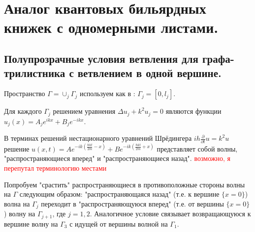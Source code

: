 \chapter{Аналог квантовых бильярдных книжек с одномерными листами.}\label{ch:ch7}

\section{Полупрозрачные условия ветвления для графа-трилистника с ветвлением в одной вершине.}\label{sec:ch7/sect1}
Пространство $\Gamma = \cup_j \Gamma_j$ используем как в \label{ch:ch4}: $\Gamma_j = [0, l_j]$.

Для каждого $\Gamma_j$ решением уравнения $\Delta u_j + k^2 u_j = 0$ являются функции 
$u_j(x) = A_j e^{i k x} + B_j e^{-i k x}$. 

В терминах решений нестационарного уравнений Шрёдингера $i h \frac{\partial }{\partial t} u = k^2 u$
решение $u(x,t) = A e^{-i k (\frac{\hbar k t}{2m} - x)} +  B e^{-i k (\frac{\hbar k t}{2m} + x)}$ представляет собой волны,  "распространяющиеся вперед" и "распространяющиеся назад".
\textcolor{red}{возможно, я перепутал терминологию местами}

Попробуем "срастить" распространяющиеся в противоположные стороны волны на $\Gamma$ следующим образом:
"распространяющаяся назад" (т.е. к вершине $\{x=0\}$) волна на $\Gamma_j$ переходит в "распространяющуюся вперед" (т.е. от вершины $\{x=0\}$) волну на $\Gamma_{j+1}$, где $j=1,2$.  Аналогичное условие связывает возвращающуюся к вершине волну на $\Gamma_3$ с идущей от вершины волной на $\Gamma_1$.

